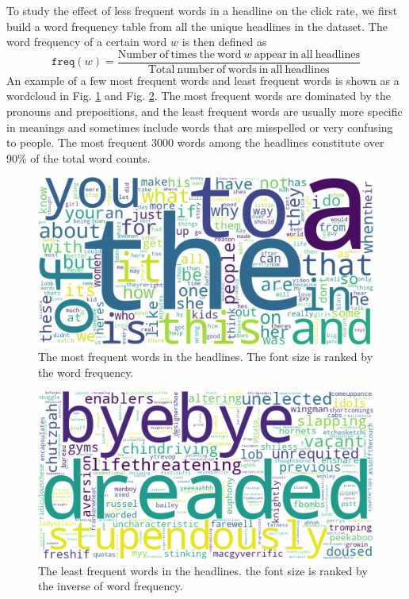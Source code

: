 \documentclass[%
preprint,
 amsmath,amssymb,
 aps,
]{revtex4-2}
\begin{document}
To study the effect of less frequent words in a headline on the click rate, we first build a word frequency table from all the unique headlines in the dataset.
The word frequency of a certain word \(w\) is then defined as
\begin{equation}
    \texttt{freq}(w) = \frac{\mathrm{Number\ of\ times\ the\ word\ } w\mathrm{\ appear\ in\ all\ headlines}}{\mathrm{Total\ number\ of\ words\ in\ all\ headlines}}
\end{equation}
An example of a few most frequent words and least frequent words is shown as a wordcloud in Fig. \ref{fig:wordcloud_most} and Fig. \ref{fig:wordcloud_least}.
The most frequent words are dominated by the pronouns and prepositions, and the least frequent words are usually more specific in meanings and sometimes include words that are misspelled or very confusing to people.
The most frequent 3000 words among the headlines constitute over 90\% of the total word counts.

\begin{figure}
    \centering
    \includegraphics[width=0.8\linewidth]{fig/wordcloud1_most_frequent.png}
    \caption{The most frequent words in the headlines. The font size is ranked by the word frequency.}
    \label{fig:wordcloud_most}
\end{figure}

\begin{figure}
    \centering
    \includegraphics[width=0.8\linewidth]{fig/wordcloud2_least_frequent.png}
    \caption{The least frequent words in the headlines. the font size is ranked by the inverse of word frequency.}
    \label{fig:wordcloud_least}
\end{figure}
\end{document}
